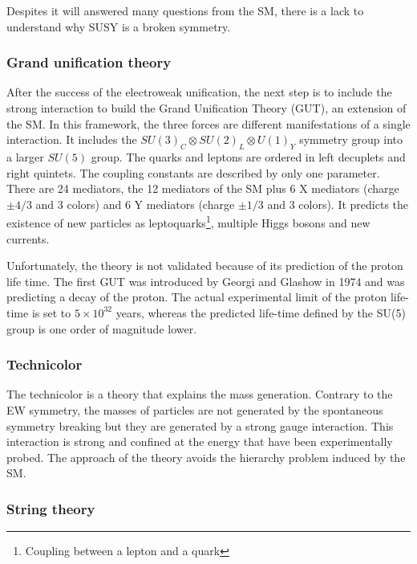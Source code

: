       Despites it will answered many questions from the \acrshort{SM}, there is a lack to understand why SUSY is a broken symmetry.
      
      \subsubsection{Grand unification theory}
      
      After the success of the electroweak unification, the next step is to include the strong interaction to build the Grand Unification Theory (GUT), an extension of the \acrshort{SM}.
      In this framework, the three forces are different manifestations of a single interaction. 
      It includes the $SU(3)_C \otimes SU(2)_L \otimes U(1)_Y$ symmetry group into a larger $SU(5)$ group. 
      The quarks and leptons are ordered in left decuplets and right quintets.
      The coupling constants are described by only one parameter.  
      There are 24 mediators, the 12 mediators of the \acrshort{SM} plus 6 X mediators (charge $\pm4/3$ and 3 colors) and 6 Y mediators (charge $\pm1/3$ and 3 colors).
      It predicts the existence of new particles as leptoquarks\footnote{Coupling between a lepton and a quark}, multiple Higgs bosons and new currents.

      Unfortunately, the theory is not validated because of its prediction of the proton life time. 
      The first GUT was introduced by Georgi and Glashow in 1974 and was predicting a decay of the proton. 
      The actual experimental limit of the proton life-time is set to $5 \times 10^{32}$ years, whereas the predicted life-time defined by the SU(5) group is one order of magnitude lower.
      \cite{Agashe:2014kda}

      \subsubsection{Technicolor}

      The technicolor is a theory that explains the mass generation.
      Contrary to the EW symmetry, the masses of particles are not generated by the spontaneous symmetry breaking but they are generated by a strong gauge interaction.
      This interaction is strong and confined at the energy that have been experimentally probed.
      The approach of the theory avoids the hierarchy problem induced by the \acrshort{SM}.
      
      \subsubsection{String theory}

